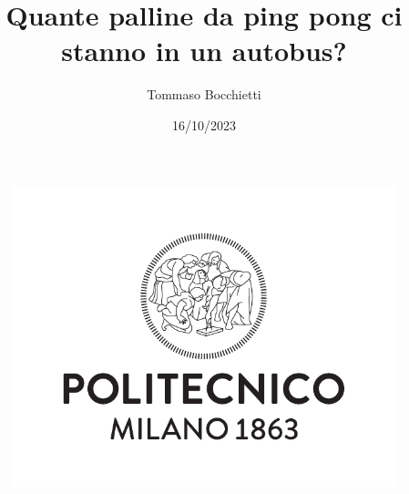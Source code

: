\documentclass[a4paper, 12pt]{article}
\title{Quante palline da ping pong ci stanno in un autobus?}
\author{Tommaso Bocchietti}
\date{16/10/2023}
\begin{document}
\begin{figure}
    \centering
    \includegraphics[width=.9\textwidth]{logo_polimi}
\end{figure}

\maketitle

\clearpage

\tableofcontents
\pagebreak





\end{document}
